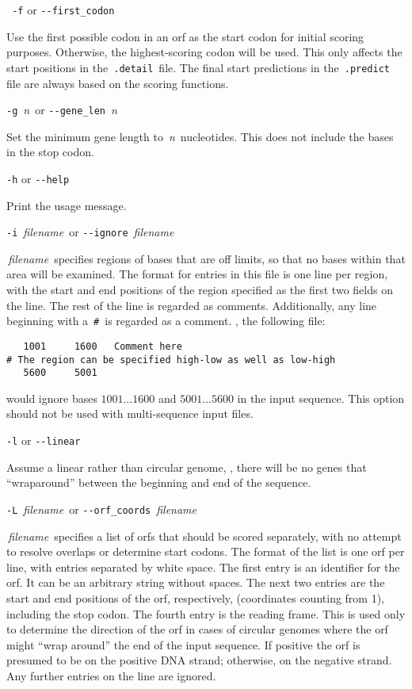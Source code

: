 \documentclass[fleqn,titlepage,11pt]{article}
\def\Desc#1{\,\mbox{\emph{#1}}\,}
\begin{document}
\exdent
 \verb` -f` \enskip or \enskip \verb`--first_codon`

  Use the first possible codon in an orf as the start codon
  for initial scoring purposes.  Otherwise, the highest-scoring
  codon will be used.  This only affects the start positions in
  the \,\verb`.detail`\, file.  The final start predictions in
  the \,\verb`.predict`\, file are always based on the scoring
  functions.

\exdent
  \verb`-g` \Desc{n} \enskip or \enskip \verb`--gene_len` \Desc{n}

  Set the minimum gene length to \Desc{n} nucleotides.  This does not include
  the bases in the stop codon.

\exdent
  \verb`-h` \enskip or \enskip \verb`--help`

  Print the usage message.

\exdent
  \verb`-i` \Desc{filename} \enskip or \enskip \verb`--ignore` \Desc{filename}

  \Desc{filename} specifies regions of bases that are off 
  limits, so that no bases within that area will be examined.
  The format for entries in this file is one line per region,
  with the start and end positions of the region specified
  as the first two fields on the line.  The rest of the line
  is regarded as comments.  Additionally, any line beginning
  with a \,\verb`#`\, is regarded as a comment.  \Eg, the
  following file:
\BSV
\begin{verbatim}
   1001     1600   Comment here
# The region can be specified high-low as well as low-high
   5600     5001
\end{verbatim}
\ESV
  would ignore bases $1001 \ldots 1600$ and $5001 \ldots 5600$
  in the input sequence.  This option should not be used with
  multi-sequence input files.

\exdent
  \verb`-l` \enskip or \enskip \verb`--linear`

  Assume a linear rather than circular genome, \ie, there will
  be no genes that ``wraparound'' between the beginning and end
  of the sequence.

\exdent
  \verb`-L` \Desc{filename} \enskip or \enskip \verb`--orf_coords` \Desc{filename}

  \Desc{filename} specifies a list of orfs that should
  be scored separately, with no attempt to resolve overlaps or
  determine start codons.  The format of the
  list is one orf per line, with entries separated by white space.
  The first entry is an identifier for the orf.  It can be an
  arbitrary string without spaces.  The next two entries are
  the start and end positions of the orf, respectively, (coordinates counting
  from 1), including the stop codon.  The fourth entry is the
  reading frame.  This is used only to determine the direction of
  the orf in cases of circular genomes where the orf might ``wrap
  around'' the end of the input sequence.  If positive the
  orf is presumed to be on the positive DNA strand; otherwise,
  on the negative strand.  Any further entries on the line are ignored.
\end{document}
